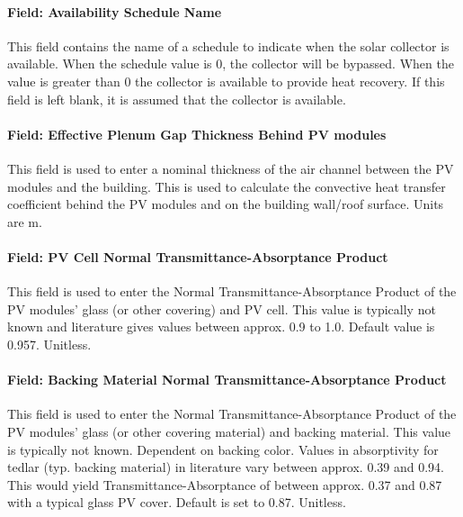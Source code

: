 \paragraph{Field: Availability Schedule Name}\label{BIPVT-field-Sched}

This field contains the name of a schedule to indicate when the solar collector is available. When the schedule value is 0, the collector will be bypassed. When the value is greater than 0 the collector is available to provide heat recovery. If this field is left blank, it is assumed that the collector is available.

\paragraph{Field: Effective Plenum Gap Thickness Behind PV modules}\label{BIPVT-field-Gap}

This field is used to enter a nominal thickness of the air channel between the PV modules and the building. This is used to calculate the convective heat transfer coefficient behind the PV modules and on the building wall/roof surface. Units are \si{\m}.

\paragraph{Field: PV Cell Normal Transmittance-Absorptance Product}\label{BIPVT-field-PVcell-tau-alpha}

This field is used to enter the Normal Transmittance-Absorptance Product of the PV modules' glass (or other covering) and PV cell. This value is typically not known and literature gives values between approx. 0.9 to 1.0. Default value is 0.957. Unitless.

\paragraph{Field: Backing Material Normal Transmittance-Absorptance Product}\label{BIPVT-field-backing-tau-alpha}

This field is used to enter the Normal Transmittance-Absorptance Product of the PV modules' glass (or other covering material) and backing material. This value is typically not known. Dependent on backing color. Values in absorptivity for tedlar (typ. backing material) in literature vary between approx. 0.39 and 0.94. This would yield Transmittance-Absorptance of between approx. 0.37 and 0.87 with a typical glass PV cover. Default is set to 0.87. Unitless.

